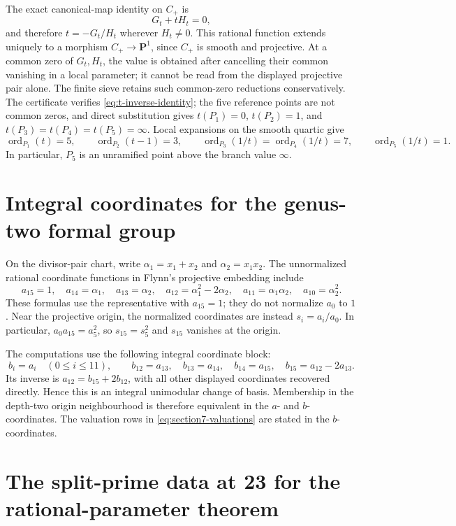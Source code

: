 \documentclass[11pt]{article}
\newcommand{\ord}{\operatorname{ord}}
\theoremstyle{definition}
\theoremstyle{remark}
\begin{document}
The exact canonical-map identity on $C_+$ is
\begin{equation}\label{eq:t-inverse-identity}
                         G_t+tH_t=0,
\end{equation}
and therefore $t=-G_t/H_t$ wherever $H_t\ne0$.
This rational function extends uniquely to a morphism
$C_+\to\mathbf P^1$, since $C_+$ is smooth and projective.
At a common zero of $G_t,H_t$, the value is obtained after cancelling
their common vanishing in a local parameter; it cannot be read from
the displayed projective pair alone.  The finite sieve retains such
common-zero reductions conservatively.  The certificate verifies
\eqref{eq:t-inverse-identity}; the five reference points are not common
zeros, and direct substitution gives
$t(P_1)=0$, $t(P_2)=1$, and $t(P_3)=t(P_4)=t(P_5)=\infty$.
Local expansions on the smooth quartic give
\[
 \ord_{P_1}(t)=5,\qquad \ord_{P_2}(t-1)=3,\qquad
 \ord_{P_3}(1/t)=\ord_{P_4}(1/t)=7,\qquad \ord_{P_5}(1/t)=1.
\]
In particular, $P_5$ is an unramified point above the branch value
$\infty$.

\section{Integral coordinates for the genus-two formal group}
\label{app:flynn}

On the divisor-pair chart, write
$\alpha_1=x_1+x_2$ and $\alpha_2=x_1x_2$.  The unnormalized rational
coordinate functions in Flynn's projective embedding include
\[
 a_{15}=1,\quad a_{14}=\alpha_1,\quad a_{13}=\alpha_2,\quad
 a_{12}=\alpha_1^2-2\alpha_2,\quad
 a_{11}=\alpha_1\alpha_2,\quad a_{10}=\alpha_2^2.
\]
These formulas use the representative with $a_{15}=1$; they do not
normalize $a_0$ to $1$.  Near the projective origin, the normalized
coordinates are instead $s_i=a_i/a_0$.  In particular,
$a_0a_{15}=a_5^2$, so $s_{15}=s_5^2$ and $s_{15}$ vanishes at the origin.

The computations use the following integral coordinate block:
\[
 b_i=a_i\quad(0\leq i\leq11),\qquad
 b_{12}=a_{13},\quad b_{13}=a_{14},\quad b_{14}=a_{15},\quad
 b_{15}=a_{12}-2a_{13}.
\]
Its inverse is $a_{12}=b_{15}+2b_{12}$, with all other displayed
coordinates recovered directly.  Hence this is an integral unimodular
change of basis.  Membership in the depth-two origin neighbourhood is
therefore equivalent in the $a$- and $b$-coordinates.  The valuation rows
in \eqref{eq:section7-valuations} are stated in the $b$-coordinates.

\section{The split-prime data at 23 for the rational-parameter theorem}
\label{app:p23-data}
\end{document}
